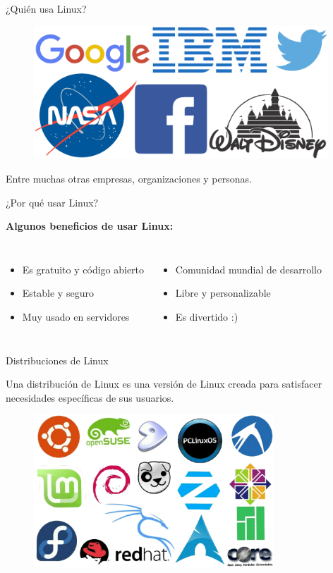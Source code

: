 \documentclass{beamer}
\begin{document}
  \begin{frame}{¿Quién usa Linux?}
    \begin{figure}[ht!]
      \centering
      \includegraphics[width=110mm]{empresas.eps}
    \end{figure}
    \centering
    {\small Entre muchas otras empresas, organizaciones y personas.}
  \end{frame}

  \begin{frame}{¿Por qué usar Linux?}
    \item \textbf{Algunos beneficios de usar Linux:}
    \begin{columns}[T,onlytextwidth]
      \begin{itemize}
        \item Es gratuito y código abierto \item Estable y seguro \item Muy usado en servidores
      \end{itemize}

      \begin{itemize}
        \item Comunidad mundial de desarrollo \item Libre y personalizable \item Es divertido :)
        \end{itemize}
      \end{columns}
    \end{frame}

    \begin{frame}{Distribuciones de Linux}
      \item Una distribución de Linux es una versión de Linux creada para satisfacer
        necesidades específicas de sus usuarios.
        \begin{figure}[ht!]
          \centering
          \includegraphics[width=90mm]{distros.eps}
        \end{figure}
    \end{frame}
\end{document}
